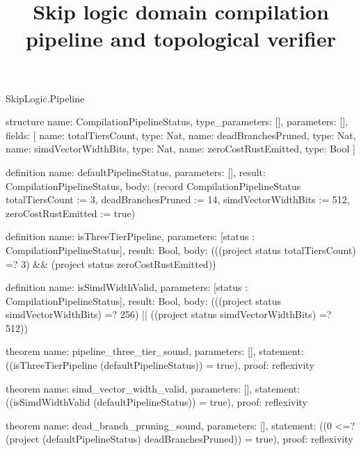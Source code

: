 \begin{lexlean}{SkipLogic.Pipeline}
\title{Skip logic domain compilation pipeline and topological verifier}
\begin{semanticmodule}
structure{
  name: CompilationPipelineStatus,
  type_parameters: [],
  parameters: [],
  fields: [
    {name: totalTiersCount, type: Nat},
    {name: deadBranchesPruned, type: Nat},
    {name: simdVectorWidthBits, type: Nat},
    {name: zeroCostRustEmitted, type: Bool}
  ]
}

definition{
  name: defaultPipelineStatus,
  parameters: [],
  result: CompilationPipelineStatus,
  body: (record CompilationPipelineStatus {totalTiersCount := 3, deadBranchesPruned := 14, simdVectorWidthBits := 512, zeroCostRustEmitted := true})
}

definition{
  name: isThreeTierPipeline,
  parameters: [status : CompilationPipelineStatus],
  result: Bool,
  body: (((project status totalTiersCount) =? 3) && (project status zeroCostRustEmitted))
}

definition{
  name: isSimdWidthValid,
  parameters: [status : CompilationPipelineStatus],
  result: Bool,
  body: (((project status simdVectorWidthBits) =? 256) || ((project status simdVectorWidthBits) =? 512))
}

theorem{
  name: pipeline_three_tier_sound,
  parameters: [],
  statement: ((isThreeTierPipeline (defaultPipelineStatus)) = true),
  proof: reflexivity{}
}

theorem{
  name: simd_vector_width_valid,
  parameters: [],
  statement: ((isSimdWidthValid (defaultPipelineStatus)) = true),
  proof: reflexivity{}
}

theorem{
  name: dead_branch_pruning_sound,
  parameters: [],
  statement: ((0 <=? (project (defaultPipelineStatus) deadBranchesPruned)) = true),
  proof: reflexivity{}
}
\end{semanticmodule}
\end{lexlean}
